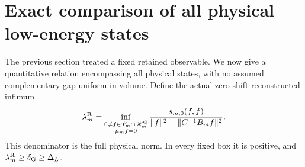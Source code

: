 \documentclass[11pt]{article}
\newcommand{\KK}{\mathscr K}
\newcommand{\VV}{\mathscr V}
\begin{document}
\section{Exact comparison of all physical low-energy states}
\label{sec:allsoft}

The previous section treated a fixed retained observable. We now give
a quantitative relation encompassing all physical states, with no
assumed complementary gap uniform in volume. Define the actual
zero-shift reconstructed infimum
\begin{equation}\label{eq:reconstructedgap}
 \lambda_m^{\rm R}
 =\inf_{\substack{0\ne f\in\VV_m\cap\KK_m^{\rm G}\\\mu_m f=0}}
 \frac{s_{m,0}(f,f)}
      {\|f\|^2+\|C^{-1}B_mf\|^2}.
\end{equation}
This denominator is the full physical norm. In every fixed box it is
positive, and $\lambda_m^{\rm R}\geq\delta_{\rm G}\geq\Delta_L$.
\end{document}
